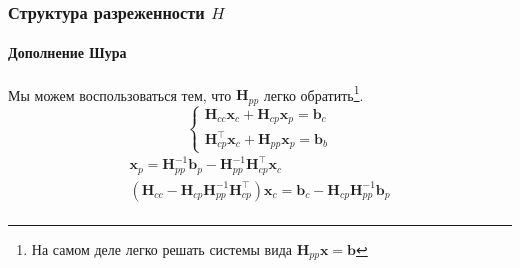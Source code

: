 \documentclass[notheorems,aspectratio=169]{beamer}
\begin{document}
\begin{frame}
  \frametitle{Структура разреженности $H$}
  \framesubtitle{Дополнение Шура}
  Мы можем воспользоваться тем, что $\mathbf{H}_{pp}$ легко обратить\footnote[frame]{На самом деле легко решать системы вида $\mathbf{H}_{pp}\mathbf{x}=\mathbf{b}$}.
  $$
  \begin{cases}
    \mathbf{H}_{cc}\mathbf{x}_c+\mathbf{H}_{cp}\mathbf{x}_p=\mathbf{b}_c \\
    \mathbf{H}_{cp}^\intercal\mathbf{x}_c+\mathbf{H}_{pp}\mathbf{x}_p=\mathbf{b}_b
  \end{cases}
  $$
  \begin{equation*}
    \begin{gathered}
    \mathbf{x}_{p}=\mathbf{H}_{pp}^{-1}\mathbf{b}_p-\mathbf{H}_{pp}^{-1}\mathbf{H}_{cp}^\intercal\mathbf{x}_c \\
       \left(\mathbf{H}_{cc}-\mathbf{H}_{cp}\mathbf{H}_{pp}^{-1}\mathbf{H}_{cp}^\intercal\right)\mathbf{x}_c=\mathbf{b}_c-\mathbf{H}_{cp}\mathbf{H}_{pp}^{-1}\mathbf{b}_p \\
    \end{gathered}
  \end{equation*}
\end{frame}



\end{document}
